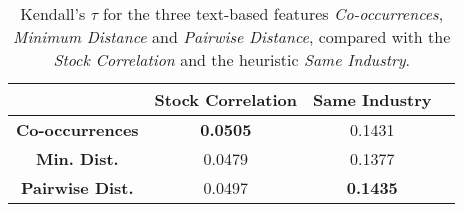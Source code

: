 \begin{table*}
    \centering
    \setlength{\tabcolsep}{0pt} %
    
    \begin{tabular*}{0.8\textwidth}{@{\extracolsep{\fill}}cccc}
        \toprule
        {} &  Stock Correlation &  Same Industry \\
        \midrule
        \textbf{Co-occurrences}    & \textbf{0.0505} & 0.1431 \\
        \textbf{Min. Dist.}        & 0.0479 & 0.1377 \\
        \textbf{Pairwise Dist.}    & 0.0497 & \textbf{0.1435} \\
        \bottomrule
    \end{tabular*}
    
    \caption{Kendall's $\tau$ for the three text-based features \emph{Co-occurrences}, \emph{Minimum Distance} and \emph{Pairwise Distance}, compared with the \emph{Stock Correlation} and the heuristic \emph{Same Industry}.}
    \label{table:corr-text-tau}
\end{table*}


